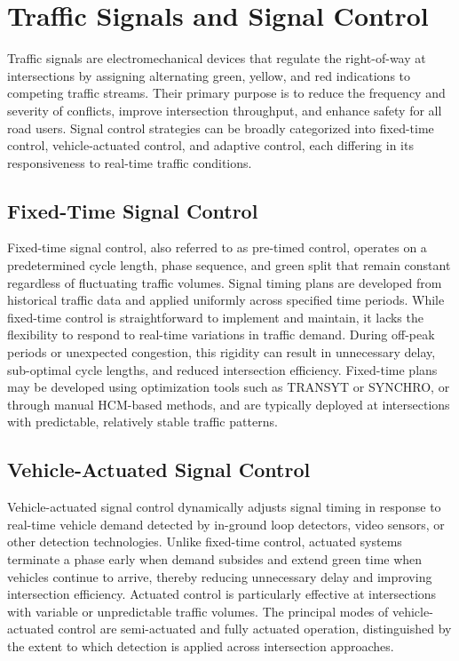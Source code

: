 \section{Traffic Signals and Signal Control}

Traffic signals are electromechanical devices that regulate 
the right-of-way at intersections by assigning alternating 
green, yellow, and red indications to competing traffic 
streams. Their primary purpose is to reduce the frequency 
and severity of conflicts, improve intersection throughput, 
and enhance safety for all road users. Signal control 
strategies can be broadly categorized into fixed-time control, 
vehicle-actuated control, and adaptive control, each 
differing in its responsiveness to real-time traffic 
conditions.


\subsection{Fixed-Time Signal Control}

Fixed-time signal control, also referred to as pre-timed 
control, operates on a predetermined cycle length, phase 
sequence, and green split that remain constant regardless of 
fluctuating traffic volumes. Signal timing plans are 
developed from historical traffic data and applied uniformly 
across specified time periods. While fixed-time control is 
straightforward to implement and maintain, it lacks the 
flexibility to respond to real-time variations in traffic 
demand. During off-peak periods or unexpected congestion, 
this rigidity can result in unnecessary delay, sub-optimal 
cycle lengths, and reduced intersection efficiency. Fixed-time 
plans may be developed using optimization tools such as 
TRANSYT or SYNCHRO, or through manual HCM-based methods, and 
are typically deployed at intersections with predictable, 
relatively stable traffic patterns.


\subsection{Vehicle-Actuated Signal Control}

Vehicle-actuated signal control dynamically adjusts signal 
timing in response to real-time vehicle demand detected by 
in-ground loop detectors, video sensors, or other detection 
technologies. Unlike fixed-time control, actuated systems 
terminate a phase early when demand subsides and extend green 
time when vehicles continue to arrive, thereby reducing 
unnecessary delay and improving intersection efficiency. 
Actuated control is particularly effective at intersections 
with variable or unpredictable traffic volumes. The principal 
modes of vehicle-actuated control are semi-actuated and 
fully actuated operation, distinguished by the extent to 
which detection is applied across intersection approaches.


